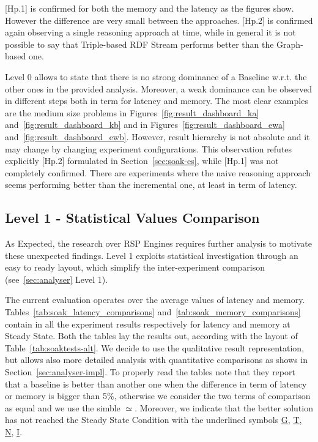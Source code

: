 [Hp.1] is confirmed for both the memory and the latency as the figures show. However the difference are very small between the approaches. [Hp.2] is confirmed again observing a single reasoning approach at time, while in general it is not possible to say that Triple-based RDF Stream performs better than the Graph-based one.

Level 0 allows to state that there is no strong dominance of a Baseline w.r.t. the other ones in the provided analysis. Moreover, a weak dominance can be observed in different steps both in term for latency  and memory. The most clear examples are the medium size problems in Figures~\ref{fig:result_dashboard_ka} and~\ref{fig:result_dashboard_kb} and in Figures~\ref{fig:result_dashboard_ewa} and~\ref{fig:result_dashboard_ewb}. However, result hierarchy is not absolute and it may change by changing experiment configurations. This observation refutes explicitly [Hp.2] formulated in Section~\ref{sec:soak-es}, while [Hp.1] was not completely confirmed. There are experiments where the naive  reasoning  approach seems performing better than the incremental one, at least in term of latency. 

%

%


\subsection{Level 1 - Statistical Values Comparison}\label{sec:eval-level1}

As Expected, the research over RSP Engines requires further analysis to motivate these unexpected findings. Level 1 exploits statistical investigation through an easy to ready layout, which simplify the inter-experiment comparison (see~\ref{sec:analyser} Level 1).



The current evaluation operates over the average values of latency and memory. Tables~\ref{tab:soak_latency_comparisons} and~\ref{tab:soak_memory_comparisons} contain in all the experiment results respectively for latency and memory at Steady State.  Both the tables lay the results out, according with the layout of Table~\ref{tab:soaktests-alt}. We decide to use the qualitative result representation, but \name allows also more detailed analysis with quantitative comparisons as shows in Section~\ref{sec:analyser-impl}. To properly read the tables note that they report that a baseline is better than another one when the difference in term of latency or memory is bigger than 5\%, otherwise we consider the two terms of comparison as equal and we use the simble $\simeq$.
Moreover, we indicate that the better solution has not reached the Steady State Condition with the underlined symbols \underline{G}, \underline{T}, \underline{N}, \underline{I}.

